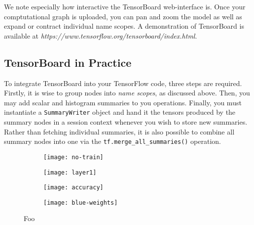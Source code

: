 We note especially how interactive the TensorBoard web-interface is. Once your
comptutational graph is uploaded, you can pan and zoom the model as well as
expand or contract individual name scopes. A demonstration of TensorBoard is
available at \emph{https://www.tensorflow.org/tensorboard/index.html}.

\subsection{TensorBoard in Practice}\label{sec:visual-code}

To integrate TensorBoard into your TensorFlow code, three steps are
required. Firstly, it is wise to group nodes into \emph{name scopes}, as
discussed above. Then, you may add scalar and histogram summaries to you
operations. Finally, you must instantiate a \texttt{SummaryWriter} object and
hand it the tensors produced by the summary nodes in a session context whenever
you wish to store new summaries. Rather than fetching individual summaries, it
is also possible to combine all summary nodes into one via the
\texttt{tf.merge\_all\_summaries()} operation.



\begin{figure}[h!]
  \centering
  \begin{subfigure}[h]{0.5\textwidth}
    \centering
    \texttt{[image: no-train]}
   \caption{}
   \label{fig:tensorboard-a}
  \end{subfigure}

  \vspace{0.3cm}

  \begin{subfigure}[h]{0.5\textwidth}
    \centering
    \texttt{[image: layer1]}
    \caption{}
    \label{fig:tensorboard-b}
  \end{subfigure}

  \vspace{0.3cm}

  \begin{subfigure}[h]{0.2\textwidth}
    \centering
    \texttt{[image: accuracy]}
    \caption{}
    \label{fig:tensorboard-c}
  \end{subfigure}
  \begin{subfigure}[h]{0.2\textwidth}
    \centering
    \texttt{[image: blue-weights]}
    \caption{}
    \label{fig:tensorboard-d}
  \end{subfigure}
  \caption{Foo}
  \label{fig:tensorboard}
\end{figure}

